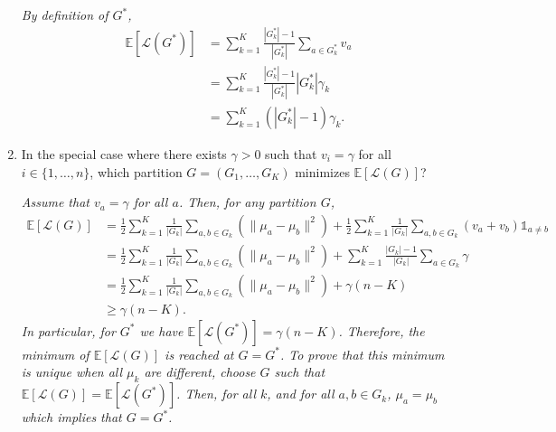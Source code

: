 \documentclass[a4paper,10pt,fleqn]{article}
\newcommand{\E}{\ensuremath{\mathbb{E}}}
\newcommand{\1}{\ensuremath{\mathbbm{1}}}
\newcommand{\crit}{\mathcal{L}}
\begin{document}
\begin{enumerate}
\vspace{.2cm}

{\em
By definition of  $G^*$,  
	\begin{align*}
	\E \left[ \crit(G^*) \right] & =\sum_{k=1}^K \frac{|G^*_k|-1}{|G^*_k|} \sum_{a \in G^*_{k}} v_a\\
	& = \sum_{k=1}^K \frac{|G^*_k|-1}{|G^*_k|} |G^*_k| \gamma_k\\
	& = \sum_{k=1}^K (|G^*_k|-1) \gamma_k.
	\end{align*}
}
\item In the special case where there exists $\gamma > 0$ such that $v_{i}=\gamma$ for all $i \in \{1,\ldots,n\}$, which partition $G=(G_{1},\ldots,G_{K})$ minimizes $\E[\crit(G)]$?

\vspace{.2cm}

{\em
Assume that $v_a = \gamma$ for all $a$. Then, for any partition $G$, 
	\begin{align*}
	\E \left[ \crit(G) \right] & = \frac{1}{2}  \sum_{k=1}^K \frac{1}{|G_k|}\sum_{a, b\in G_{k}} \left( \| \mu_a - \mu_b\|^2 \right)
	+ \frac{1}{2}  \sum_{k=1}^K \frac{1}{|G_k|}\sum_{a, b\in G_{k}} \left( v_a + v_b \right) \mathds{1}_{a \neq b}\\
	& = \frac{1}{2}  \sum_{k=1}^K \frac{1}{|G_k|}\sum_{a, b\in G_{k}} \left( \| \mu_a - \mu_b\|^2 \right) + \sum_{k=1}^K \frac{|G_k|-1}{|G_k|} \sum_{a \in G_k} \gamma\\
	& = \frac{1}{2}  \sum_{k=1}^K \frac{1}{|G_k|}\sum_{a, b\in G_{k}} \left( \| \mu_a - \mu_b\|^2 \right) + \gamma(n-K) \\
	& \geqslant \gamma(n-K).
	\end{align*}
	In particular, for $G^*$ we have $\E \left[ \crit(G^*) \right] = \gamma(n-K)$.
	Therefore, the minimum of $\E \left[ \crit(G) \right]$ is reached at $G = G^*$.
	To prove that this minimum is unique when all $\mu_k$ are different, choose $G$ such that $\E \left[ \crit(G) \right] = \E \left[ \crit(G^*) \right]$.
	Then, for all $k$, and for all $a,b \in G_k$,  $\mu_a = \mu_b$ which implies that $G = G^*$.
}
\end{enumerate}
	
\end{document}
